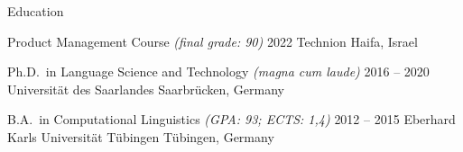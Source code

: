 \documentclass{resume} %
\begin{document}
\begin{rSection}{Education}
	
	\begin{rSubsection}
		{Product Management Course \footnotesize{\textit{(final grade: 90)}}}
		{2022}
		{Technion}
		{Haifa, Israel}
		
		\setlength{\itemindent}{.5cm}
		
		\item[]\vspace{-0.5cm}%
	\end{rSubsection}
	
	\begin{rSubsection}
		{Ph.D.\ in Language Science and Technology \footnotesize{\textit{(magna cum laude)}}}
		{2016 -- 2020}
		{Universität des Saarlandes}
		{Saarbrücken, Germany}
		
		\setlength{\itemindent}{.5cm}
		
		\item[]\vspace{-0.5cm}%
	\end{rSubsection}
	
	
	\begin{rSubsection}
		{B.A.\ in Computational Linguistics \footnotesize{\textit{(GPA: 93; ECTS: 1,4)}}}
		{2012 -- 2015}
		{Eberhard Karls Universität Tübingen}
		{Tübingen, Germany}
		

\end{rSubsection}
\end{rSection}
\end{document}
